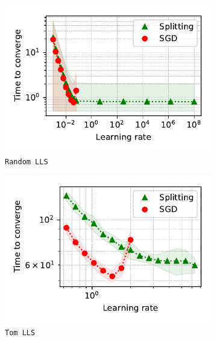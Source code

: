 \documentclass{article}
\begin{document}
\begin{figure}[h!]
    \begin{subfigure}[b]{0.25\textwidth}
            \centering
            \includegraphics[width=\linewidth]{LLS_time.pdf}
            \caption{{\small \texttt{Random LLS}}}
    \end{subfigure}%
    \begin{subfigure}[b]{0.25\textwidth}
            \centering
            \includegraphics[width=\linewidth]{LLS_tom_time.pdf}
            \caption{{\small \texttt{Tom LLS}}}
    \end{subfigure}%
    \begin{subfigure}[b]{0.25\textwidth}
            \centering

\end{subfigure}
\end{figure}
\end{document}
